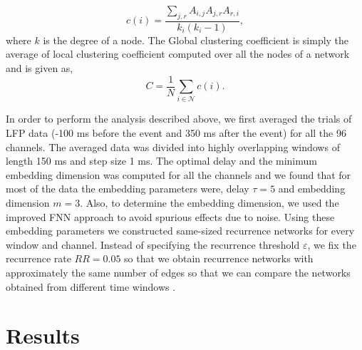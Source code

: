 \documentclass[letterpaper, 9pt, conference]{ieeeconf}
\begin{document}
\begin{equation}
c(i)=\frac{\sum_{j,r}A_{i,j}A_{j,r}A_{r,i}}{k_{i}(k_{i}-1)},
\end{equation}
where $k$ is the degree of a node. The Global clustering coefficient is simply the average of local clustering coefficient computed over all the nodes of a network and is given as,
\begin{equation}
C= \frac{1}{N}\sum_{i\in\mathcal{N}}c(i).
\end{equation}


In order to perform the analysis described above, we first averaged the trials of LFP data (-100 ms before the event and 350 ms after the event) for all the 96 channels. The averaged data was divided into highly overlapping windows of length 150 ms and step size 1 ms. The optimal delay and the minimum embedding dimension was computed for all the channels and we found that for most of the data the embedding parameters were, delay $\tau = 5$ and embedding dimension $m=3$. Also, to determine the embedding dimension, we used the improved FNN approach \cite{hegger1999improved} to avoid spurious effects due to noise. Using these embedding parameters we constructed same-sized recurrence networks for every window and channel. Instead of specifying the recurrence threshold $\varepsilon$, we fix the recurrence rate $RR = 0.05$ so that we obtain recurrence networks with approximately the same number of edges so that we can compare the networks obtained from different time windows \cite{donner2011recurrence}.


\section{Results}
\label{sec:results}
\end{document}
